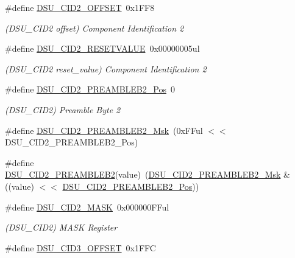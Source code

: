 \begin{DoxyCompactItemize}
\#define \mbox{\hyperlink{group___s_a_m_d21___d_s_u_gab07b638d6710bb917955217815dcd84e}{D\+S\+U\+\_\+\+C\+I\+D2\+\_\+\+O\+F\+F\+S\+ET}}~0x1\+F\+F8
\begin{DoxyCompactList}\small\item\em (D\+S\+U\+\_\+\+C\+I\+D2 offset) Component Identification 2 \end{DoxyCompactList}\item 
\#define \mbox{\hyperlink{group___s_a_m_d21___d_s_u_ga0276c33d43081b5c8cd478b611723f36}{D\+S\+U\+\_\+\+C\+I\+D2\+\_\+\+R\+E\+S\+E\+T\+V\+A\+L\+UE}}~0x00000005ul
\begin{DoxyCompactList}\small\item\em (D\+S\+U\+\_\+\+C\+I\+D2 reset\+\_\+value) Component Identification 2 \end{DoxyCompactList}\item 
\#define \mbox{\hyperlink{group___s_a_m_d21___d_s_u_ga755afb0dc289f0eeaaf805636836da72}{D\+S\+U\+\_\+\+C\+I\+D2\+\_\+\+P\+R\+E\+A\+M\+B\+L\+E\+B2\+\_\+\+Pos}}~0
\begin{DoxyCompactList}\small\item\em (D\+S\+U\+\_\+\+C\+I\+D2) Preamble Byte 2 \end{DoxyCompactList}\item 
\#define \mbox{\hyperlink{group___s_a_m_d21___d_s_u_gac588c40c7349a7b9803a8e38bfe9118a}{D\+S\+U\+\_\+\+C\+I\+D2\+\_\+\+P\+R\+E\+A\+M\+B\+L\+E\+B2\+\_\+\+Msk}}~(0x\+F\+Ful $<$$<$ D\+S\+U\+\_\+\+C\+I\+D2\+\_\+\+P\+R\+E\+A\+M\+B\+L\+E\+B2\+\_\+\+Pos)
\item 
\#define \mbox{\hyperlink{group___s_a_m_d21___d_s_u_ga826f45b240e84f67a102fd541f6184f1}{D\+S\+U\+\_\+\+C\+I\+D2\+\_\+\+P\+R\+E\+A\+M\+B\+L\+E\+B2}}(value)~(\mbox{\hyperlink{group___s_a_m_d21___d_s_u_gac588c40c7349a7b9803a8e38bfe9118a}{D\+S\+U\+\_\+\+C\+I\+D2\+\_\+\+P\+R\+E\+A\+M\+B\+L\+E\+B2\+\_\+\+Msk}} \& ((value) $<$$<$ \mbox{\hyperlink{group___s_a_m_d21___d_s_u_ga755afb0dc289f0eeaaf805636836da72}{D\+S\+U\+\_\+\+C\+I\+D2\+\_\+\+P\+R\+E\+A\+M\+B\+L\+E\+B2\+\_\+\+Pos}}))
\item 
\#define \mbox{\hyperlink{group___s_a_m_d21___d_s_u_gaedee750a7bad4de75131402ddea84c91}{D\+S\+U\+\_\+\+C\+I\+D2\+\_\+\+M\+A\+SK}}~0x000000\+F\+Ful
\begin{DoxyCompactList}\small\item\em (D\+S\+U\+\_\+\+C\+I\+D2) M\+A\+SK Register \end{DoxyCompactList}\item 
\#define \mbox{\hyperlink{group___s_a_m_d21___d_s_u_ga9863199733ba4498f102f28fc2c40021}{D\+S\+U\+\_\+\+C\+I\+D3\+\_\+\+O\+F\+F\+S\+ET}}~0x1\+F\+FC

\end{DoxyCompactItemize}
